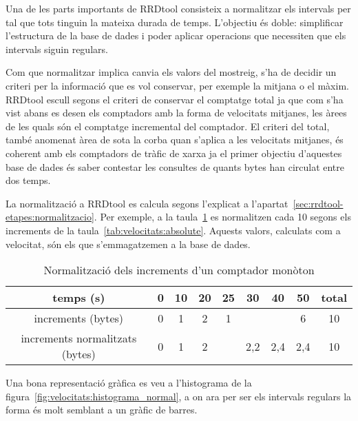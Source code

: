 Una de les parts importants de RRDtool consisteix a normalitzar els intervals per tal que tots tinguin la mateixa durada de temps. L'objectiu és doble: simplificar l'estructura de la base de dades i poder aplicar operacions que necessiten que els intervals siguin regulars.

Com que normalitzar implica canvia els valors del mostreig, s'ha de decidir un criteri per la informació que es vol conservar, per exemple la mitjana o el màxim. RRDtool escull segons el criteri de conservar el comptatge total ja que com s'ha vist abans es desen els comptadors amb la forma de velocitats mitjanes, les àrees de les quals són el comptatge incremental del comptador. 
El criteri del total, també anomenat àrea de sota la corba quan s'aplica a les velocitats mitjanes, és coherent amb els comptadors de tràfic de xarxa ja el primer objectiu d'aquestes base de dades és saber contestar les consultes de quants bytes han circulat entre dos temps.


La normalització a RRDtool es calcula  segons l'explicat a l'apartat~\ref{sec:rrdtool-etapes:normalitzacio}. Per exemple, a la taula~\ref{tab:velocitats:absolute_normal} es normalitzen cada 10 segons els increments de la taula~\ref{tab:velocitats:absolute}. Aquests valors, calculats com a velocitat, són els que s'emmagatzemen a la base de dades.

\begin{table}[tbp]
\centering
\begin{tabular}{c|ccccccc||c}
  temps (s) &  0 & 10 & 20 &25 & 30 & 40 & 50 & total \\ \hline
increments (bytes)& 0 & 1 & 2 & 1 & & & 6 & 10 \\ 
increments normalitzats (bytes)& 0 & 1 & 2 &  & 2,2 & 2,4 & 2,4 & 10
\end{tabular}
\caption{Normalització dels increments d'un comptador monòton}
\label{tab:velocitats:absolute_normal}
\end{table}

Una bona representació gràfica es veu a l'histograma de la figura~\ref{fig:velocitats:histograma_normal}, a on ara  per ser els intervals regulars la forma és molt semblant a un gràfic de barres. 


